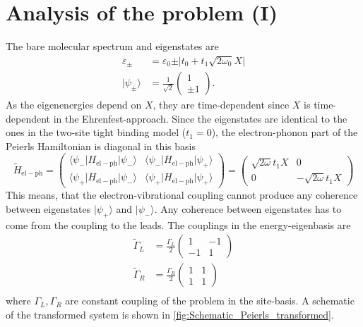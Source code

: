 \documentclass{article}
\begin{document}
\section{Analysis of the problem (I)}
The bare molecular spectrum and eigenstates are
\begin{align}
	\varepsilon_\pm &= \varepsilon_0 \pm \vert t_0 +t_1\sqrt{2\omega_0}X\vert\\
	\vert \psi_\pm\rangle &= \frac{1}{\sqrt{2}}\begin{pmatrix}
		1\\
		\pm 1
	\end{pmatrix}.
\end{align}
As the eigenenergies depend on $X$, they are time-dependent since $X$ is time-dependent in the Ehrenfest-approach.
Since the eigenstates are identical to the ones in the two-site tight binding model ($t_1 = 0$), the electron-phonon part of the Peierls Hamiltonian is diagonal in this basis 
\begin{equation}
	\tilde{H}_\mathrm{el-ph} = \begin{pmatrix}
		\langle \psi_- \vert H_\mathrm{el-ph}\vert \psi_-\rangle & \langle \psi_- \vert H_\mathrm{el-ph}\vert \psi_+\rangle\\
		\langle \psi_+ \vert H_\mathrm{el-ph}\vert \psi_-\rangle & \langle \psi_+ \vert H_\mathrm{el-ph}\vert \psi_+\rangle
	\end{pmatrix}
	= \begin{pmatrix}
		\sqrt{2\omega}t_1 X & 0\\
		0 & -\sqrt{2\omega}t_1 X
	\end{pmatrix}
\end{equation}
This means, that the electron-vibrational coupling cannot produce any coherence between eigenstates $\vert \psi_+\rangle$ and $\vert \psi_-\rangle$. Any coherence between eigenstates has to come from the coupling to the leads. The couplings in the energy-eigenbasis are
\begin{align}
	\tilde{\Gamma}_L &=  \frac{\Gamma_L}{2}\begin{pmatrix}
		1 & -1 \\
		-1 & 1
	\end{pmatrix}\\
	\tilde{\Gamma}_R &=  \frac{\Gamma_R}{2}\begin{pmatrix}
		1 & 1 \\
		1 & 1
	\end{pmatrix}\\
\end{align}
where $\Gamma_L, \Gamma_R$ are constant coupling of the problem in the site-basis. A schematic of the transformed system is shown in \cref{fig:Schematic_Peierls_transformed}.
\end{document}
